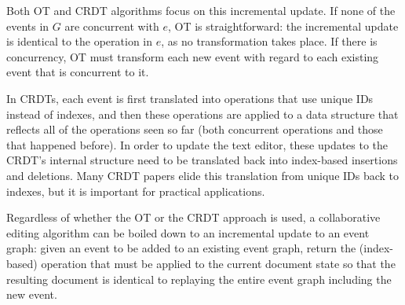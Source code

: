 \documentclass[sigplan,10pt]{acmart}
\begin{document}
Both OT and CRDT algorithms focus on this incremental update.
If none of the events in $G$ are concurrent with $e$, OT is straightforward: the incremental update is identical to the operation in $e$, as no transformation takes place.
If there is concurrency, OT must transform each new event with regard to each existing event that is concurrent to it.

In CRDTs, each event is first translated into operations that use unique IDs instead of indexes, and then these operations are applied to a data structure that reflects all of the operations seen so far (both concurrent operations and those that happened before).
In order to update the text editor, these updates to the CRDT's internal structure need to be translated back into index-based insertions and deletions.
Many CRDT papers elide this translation from unique IDs back to indexes, but it is important for practical applications. %



Regardless of whether the OT or the CRDT approach is used, a collaborative editing algorithm can be boiled down to an incremental update to an event graph: given an event to be added to an existing event graph, return the (index-based) operation that must be applied to the current document state so that the resulting document is identical to replaying the entire event graph including the new event.

\end{document}
